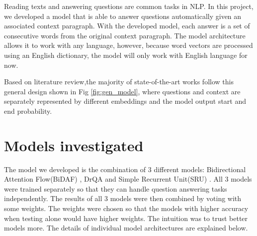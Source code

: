 \documentclass[paper=a4, fontsize=11pt]{scrartcl} %
\begin{document}
Reading texts and answering questions are common tasks in NLP. In this project, we developed a model that is able to answer questions automatically given an associated context paragraph. 
With the developed model, each answer is a set of consecutive words from the original context paragraph. The model architecture allows it to work with any language, however, because word vectors are processed using an English dictionary, the model will only work with English language for now.

Based on literature review,the majority of state-of-the-art works follow this general design shown in Fig \ref{fig:gen_model}, where questions and context are separately represented by different embeddings and the model output start and end probability.

\section{Models investigated}
The model we developed is the combination of 3 different models: Bidirectional Attention Flow(BiDAF) \cite{DBLP:journals/corr/SeoKFH16}, DrQA\cite{DBLP:journals/corr/ChenFWB17} and Simple Recurrent Unit(SRU) \cite{DBLP:journals/corr/abs-1709-02755}. All 3 models were trained separately so that they can handle question answering tasks independently. The results of all 3 models were then combined by voting with some weights. The weights were chosen so that the models with higher accuracy when testing alone would have higher weights. The intuition was to trust better models more.
The details of individual model architectures are explained below.
\end{document}

